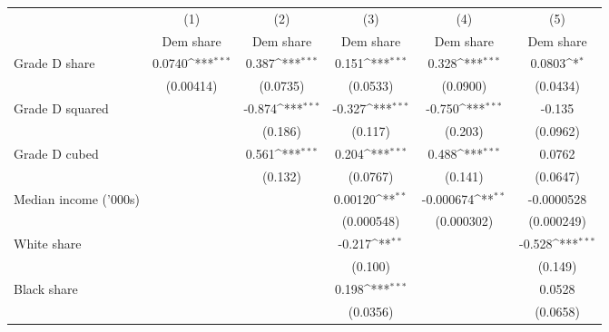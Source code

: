 {
\def\sym#1{\ifmmode^{#1}\else\(^{#1}\)\fi}
\begin{tabular}{l*{5}{c}}
\toprule
                    &\multicolumn{1}{c}{(1)}&\multicolumn{1}{c}{(2)}&\multicolumn{1}{c}{(3)}&\multicolumn{1}{c}{(4)}&\multicolumn{1}{c}{(5)}\\
                    &\multicolumn{1}{c}{Dem share}&\multicolumn{1}{c}{Dem share}&\multicolumn{1}{c}{Dem share}&\multicolumn{1}{c}{Dem share}&\multicolumn{1}{c}{Dem share}\\
\midrule
Grade D share       &      0.0740\sym{***}&       0.387\sym{***}&       0.151\sym{***}&       0.328\sym{***}&      0.0803\sym{*}  \\
                    &   (0.00414)         &    (0.0735)         &    (0.0533)         &    (0.0900)         &    (0.0434)         \\
\addlinespace
Grade D squared     &                     &      -0.874\sym{***}&      -0.327\sym{***}&      -0.750\sym{***}&      -0.135         \\
                    &                     &     (0.186)         &     (0.117)         &     (0.203)         &    (0.0962)         \\
\addlinespace
Grade D cubed       &                     &       0.561\sym{***}&       0.204\sym{***}&       0.488\sym{***}&      0.0762         \\
                    &                     &     (0.132)         &    (0.0767)         &     (0.141)         &    (0.0647)         \\
\addlinespace
Median income ('000s)&                     &                     &     0.00120\sym{**} &   -0.000674\sym{**} &  -0.0000528         \\
                    &                     &                     &  (0.000548)         &  (0.000302)         &  (0.000249)         \\
\addlinespace
White share         &                     &                     &      -0.217\sym{**} &                     &      -0.528\sym{***}\\
                    &                     &                     &     (0.100)         &                     &     (0.149)         \\
\addlinespace
Black share         &                     &                     &       0.198\sym{***}&                     &      0.0528         \\
                    &                     &                     &    (0.0356)         &                     &    (0.0658)         \\

\end{tabular}}
